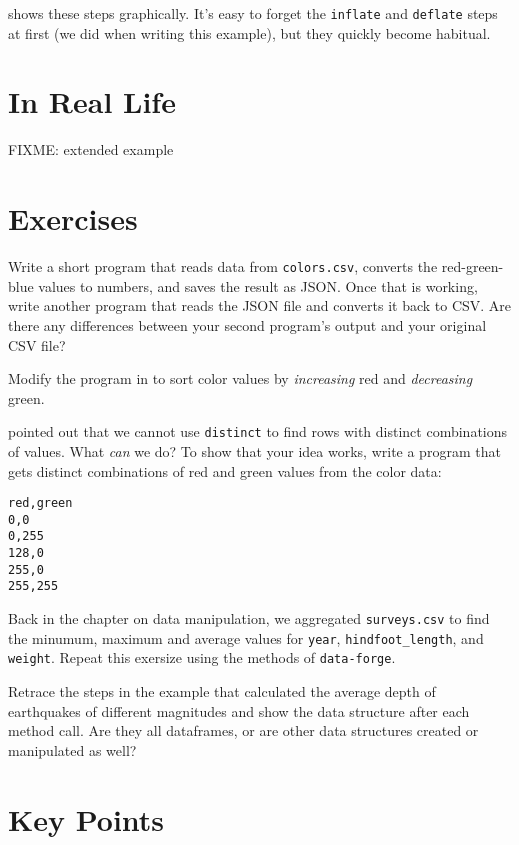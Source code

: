  shows these steps graphically.
It's easy to forget the \texttt{inflate} and \texttt{deflate} steps at first
(we did when writing this example),
but they quickly become habitual.


\section{In Real Life}\label{s:dataforge-real}

FIXME: extended example

\section{Exercises}\label{s:dataforge-exercises}


Write a short program that reads data from \texttt{colors.csv},
converts the red-green-blue values to numbers,
and saves the result as JSON.
Once that is working,
write another program that reads the JSON file and converts it back to CSV.
Are there any differences between your second program's output
and your original CSV file?


Modify the program in  to sort color values
by \emph{increasing} red and \emph{decreasing} green.


 pointed out that we cannot use \texttt{distinct}
to find rows with distinct combinations of values.
What \emph{can} we do?
To show that your idea works,
write a program that gets distinct combinations of red and green values from the color data:

\begin{verbatim}
red,green
0,0
0,255
128,0
255,0
255,255
\end{verbatim}


Back in the chapter on data manipulation,
we aggregated \texttt{surveys.csv} to find the minumum, maximum and average values 
for \texttt{year}, \texttt{hindfoot\_length}, and \texttt{weight}.
Repeat this exersize using the methods of \texttt{data-forge}.


Retrace the steps in the example that calculated
the average depth of earthquakes of different magnitudes
and show the data structure after each method call.
Are they all dataframes,
or are other data structures created or manipulated as well?

\section*{Key Points}


